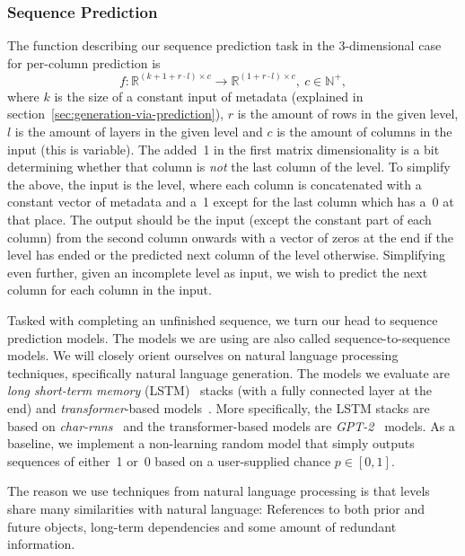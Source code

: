 \subsubsection{Sequence Prediction}
\label{sec:sequence-prediction}

The function describing our sequence prediction task in the
3-dimensional case for per-column prediction is
\begin{equation*}
  f: \mathbb{R}^{(k + 1 + r \cdot l) \times c} \to \mathbb{R}^{(1 + r \cdot l) \times c},\ c \in \mathbb{N}^{+},
\end{equation*}
where $k$ is the size of a constant input of metadata (explained in
section~\ref{sec:generation-via-prediction}), $r$ is the amount of
rows in the given level, $l$ is the amount of layers in the given
level and $c$ is the amount of columns in the input (this is
variable). The added~1 in the first matrix dimensionality is a bit
determining whether that column is \emph{not} the last column of the
level. To simplify the above, the input is the level, where each
column is concatenated with a constant vector of metadata and a~1
except for the last column which has a~0 at that place. The output
should be the input (except the constant part of each column) from the
second column onwards with a vector of zeros at the end if the level
has ended or the predicted next column of the level otherwise.
Simplifying even further, given an incomplete level as input, we wish
to predict the next column for each column in the input.

Tasked with completing an unfinished sequence, we turn our head to
sequence prediction models. The models we are using are also called
sequence-to-sequence models. We will closely orient ourselves on
natural language processing techniques, specifically natural language
generation. The models we evaluate are \emph{long short-term memory}
(LSTM)~\cite{hochreiterLongShorttermMemory1997} stacks (with a fully
connected layer at the end) and \emph{transformer}-based
models~\cite{vaswaniAttentionAllYou2017}. More specifically, the LSTM
stacks are based on \emph{char-rnns}~\cite{andrejKarpathyCharrnn2019}
and the transformer-based models are
\mbox{\emph{GPT-2}}~\cite{radfordLanguageModelsAre,OpenaiGpt22019}
models. As a baseline, we implement a non-learning random model that
simply outputs sequences of either~1 or~0 based on a user-supplied
chance $p \in [0, 1]$.

The reason we use techniques from natural language processing is that
levels share many similarities with natural language: References to
both prior and future objects, long-term dependencies and some amount
of redundant information.

